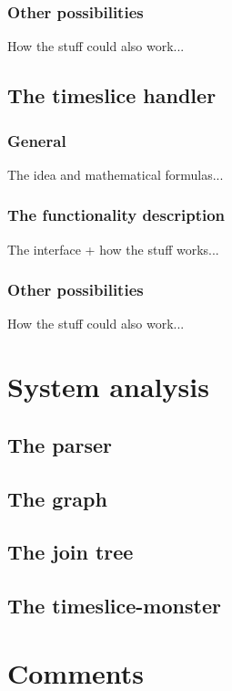 \documentclass[12pt,a4paper]{report}
\begin{document}
\subsection{Other possibilities}

How the stuff could also work...


\newpage
\section{The timeslice handler} %
\subsection{General}

The idea and mathematical formulas...

\subsection{The functionality description}

The interface + how the stuff works...

\subsection{Other possibilities}

How the stuff could also work...



\newpage
\chapter{System analysis}
\section{The parser}

\section{The graph}

\section{The join tree}

\section{The timeslice-monster}


\newpage
\chapter{Comments}


\newpage
%
\end{document}
